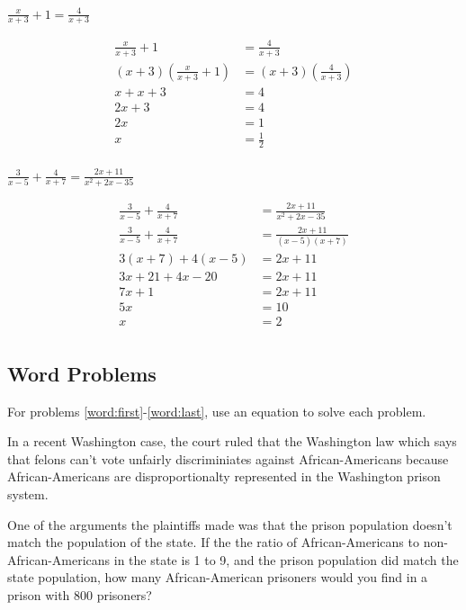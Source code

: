 \documentclass[fleqn,addpoints]{exam}
\begin{document}
\begin{questions}
\question[7] \( \displaystyle \frac{x}{x+3} + 1 = \frac{4}{x+3}\)
\begin{solution}[6 cm]
\begin{align*}
  \frac{x}{x+3} + 1 &= \frac{4}{x+3} \\
  (x + 3) \left( \frac{x}{x+3} + 1 \right) &= (x+3) \left( \frac{4}{x+3} \right) \\
  x + x + 3 &= 4 \\
  2x + 3 &= 4 \\
  2x  &= 1 \\
  x  &= \frac{1}{2} \\
\end{align*}
\end{solution}

\question[10] \( \displaystyle \frac{3}{x-5} + \frac{4}{x+7} = \frac{2x+11}{x^2+2x-35} \)
\label{equation:last}
\begin{solution}[5 cm]
\begin{align*}
  \frac{3}{x-5} + \frac{4}{x+7} &= \frac{2x+11}{x^2+2x-35} \\
  \frac{3}{x-5} + \frac{4}{x+7} &= \frac{2x+11}{(x-5)(x+7)} \\
  3(x+7) + 4(x-5) &= 2x+11 \\
  3x+21 + 4x-20 &= 2x+11 \\
  7x+1 &= 2x+11 \\
  5x &= 10 \\
  x &= 2 \\
\end{align*}
\end{solution}

\subsection{Word Problems}

For problems \ref{word:first}-\ref{word:last}, use an equation to solve each problem.

\question[7]
\label{word:first}

In a recent Washington case, the court ruled that the Washington law which says that felons can't vote unfairly
discriminiates against African-Americans because African-Americans are disproportionalty represented in the Washington
prison system.

One of the arguments the plaintiffs made was that the prison population doesn't match the population of the state.  If
the the ratio of African-Americans to non-African-Americans in the state is 1 to 9, and the prison population did match
the state population, how many African-American prisoners would you find in a prison with 800 prisoners?


\end{questions}
\end{document}
